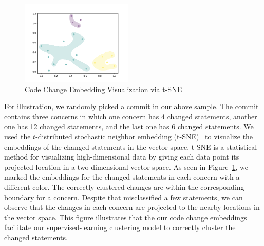 
\begin{figure}[t]
	\centering
	\includegraphics[width=2.1in]{figures/RQ5.png}
	\vspace{-18pt}
	\caption{Code Change Embedding Visualization via t-SNE}
	\label{fig:vis}
\end{figure}

For illustration, we randomly picked a commit in our above
sample. The commit contains three concerns in which one concern has 4
changed statements, another one has 12 changed statements, and the
last one has 6 changed statements. We used the $t$-distributed
stochastic neighbor embedding (t-SNE)~\cite{tsne} to visualize the
embeddings of the changed statements in the vector space. t-SNE is a
statistical method for visualizing high-dimensional data by giving
each data point its projected location in a two-dimensional vector
space. As seen in Figure~\ref{fig:vis}, we marked the embeddings for
the changed statements in each concern with a different color. The
correctly clustered changes are within the corresponding boundary for
a concern. Despite that {\tool} misclassified a few statements,
we can observe that the changes in each concern are projected to the
nearby locations in the vector space. This figure illustrates that the
our code change embeddings facilitate our supervised-learning
clustering model to correctly cluster the changed statements.




